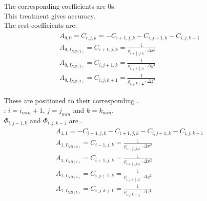 \documentclass{article}
\numberwithin{equation}{subsection}
\begin{document}
The corresponding coefficients are $0$s.\\
This treatment gives  accuracy.\\
The rest coefficients are:
\begin{align}
\begin{split}
&  A_{0,0} = C_{i,j,k} = - C_{i+1,j,k} - C_{i,j+1,k} - C_{i,j,k+1} \\
&  A_{0,I_{NB(1)}} = C_{i+1,j,k} = \frac{1}{\rho_{i+\frac{1}{2},j,k} \cdot \Delta x^2} \\
&  A_{0,I_{NB(3)}} = C_{i,j+1,k} = \frac{1}{\rho_{i,j+\frac{1}{2},k} \cdot \Delta y^2} \\
&  A_{0,I_{NB(5)}} = C_{i,j,k+1} = \frac{1}{\rho_{i,j,k+\frac{1}{2}} \cdot \Delta z^2}
\end{split}
\end{align}

These are positioned to their corresponding .\\
: $i = i_{min}+1$, $j = j_{min}$ and $k = k_{min}$, \\
$\Phi_{i,j-1,k}$ and $\Phi_{i,j,k-1}$ are .\\
\begin{align}
\begin{split}
& A_{1, 1} = -C_{i-1,j,k} - C_{i+1,j,k} - C_{i,j+1,k} -C_{i,j,k+1} \\
& A_{1, I_{NB(0)}} = C_{i-1,j,k} = \frac{1}{\rho_{i-\frac{1}{2},j,k} \cdot \Delta x^2} \\
& A_{1, I_{NB(1)}} = C_{i+1,j,k} = \frac{1}{\rho_{i+\frac{1}{2},j,k} \cdot \Delta x^2} \\
& A_{1, I_{NB(3)}} = C_{i,j+1,k} = \frac{1}{\rho_{i,j+\frac{1}{2},k} \cdot \Delta y^2} \\
& A_{1, I_{NB(5)}} = C_{i,j,k+1} = \frac{1}{\rho_{i,j,k+\frac{1}{2}} \cdot \Delta z^2} 
\end{split}
\end{align}
\end{document}
